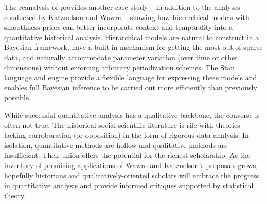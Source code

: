 The reanalysis of 
provides another case study -- in addition to the analyses conducted by Katznelson and 
Wawro -- showing how hierarchical models with smoothness priors can better incorporate 
context and temporality into a quantitative historical analysis. Hierarchical models are 
natural to construct in a Bayesian framework, have a built-in mechanism for getting the most
out of sparse data, and naturally accommodate parameter variation (over time or other dimensions) 
without enforcing arbitrary periodization schemes. The Stan language and engine provide 
a flexible language for expressing these models and enables full Bayesian inference to be carried 
out more efficiently than previously possible.  

While successful quantitative analysis has a qualitative backbone, 
the converse is often not true. The historical social scientific literature 
is rife with theories lacking corroboration (or opposition) in the form of rigorous 
data analysis. In isolation, quantitative methods are hollow and
qualitative methods are insufficient. Their union offers the potential for 
the richest scholarship.  As the inventory of promising applications of Wawro and 
Katznelson's proposals grows, hopefully historians and qualitatively-oriented 
scholars will embrace the progress in quantitative analysis and provide informed 
critiques supported by statistical theory. 

